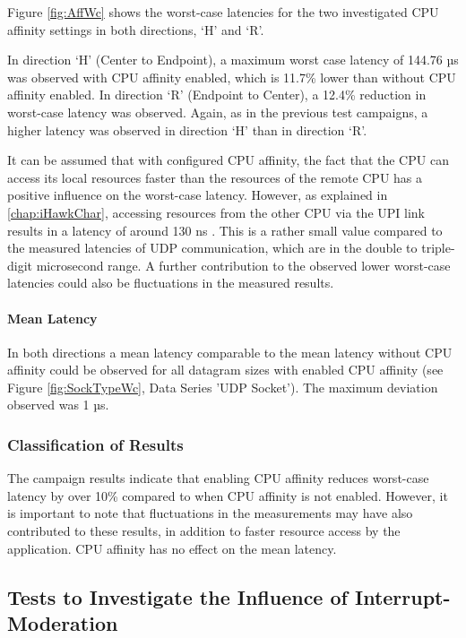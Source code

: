 Figure \ref{fig:AffWc} shows the worst-case latencies for the two investigated CPU affinity settings in both directions, `H' and `R'.

In direction `H' (Center to Endpoint), a maximum worst case latency of 144.76 µs was observed with CPU affinity enabled, which is 11.7\% lower than without CPU affinity enabled. In direction `R' (Endpoint to Center), a 12.4\% reduction in worst-case latency was observed. Again, as in the previous test campaigns, a higher latency was observed in direction `H' than in direction `R'.

It can be assumed that with configured CPU affinity, the fact that the CPU can access its local resources faster than the resources of the remote CPU has a positive influence on the worst-case latency. However, as explained in \ref{chap:iHawkChar}, accessing resources from the other CPU via the UPI link results in a latency of around 130 ns \cite{setup07}. This is a rather small value compared to the measured latencies of UDP communication, which are in the double to triple-digit microsecond range. A further contribution to the observed lower worst-case latencies could also be fluctuations in the measured results.

\paragraph{Mean Latency}

In both directions a mean latency comparable to the mean latency without CPU affinity could be observed for all datagram sizes with enabled CPU affinity (see Figure \ref{fig:SockTypeWc}, Data Series 'UDP Socket'). The maximum deviation observed was 1 µs.

\subsubsection{Classification of Results}
The campaign results indicate that enabling CPU affinity reduces worst-case latency by over 10\% compared to when CPU affinity is not enabled. However, it is important to note that fluctuations in the measurements may have also contributed to these results, in addition to faster resource access by the application. CPU affinity has no effect on the mean latency.

\subsection{Tests to Investigate the Influence of Interrupt-Moderation}

